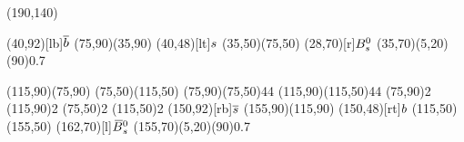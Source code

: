 \documentclass{standalone}
\begin{document}
\begin{axopicture}(190,140)

  \Text(40,92)[lb]{${\overline {{b}}}$}    %
  \Line[arrow](75,90)(35,90)        %
  \Text(40,48)[lt]{${s}$}       %
  \Line[arrow](35,50)(75,50)        %
  \Text(28,70)[r]{${{B}^0_{s}}$}            %
  \GOval(35,70)(5,20)(90){0.7}      %
                                    
  \Line[arrow](115,90)(75,90)       %
  \Line[arrow](75,50)(115,50)       %
  \Photon(75,90)(75,50){4}{4}       %
  \Photon(115,90)(115,50){4}{4}     %
  \Vertex(75,90){2}                 %
  \Vertex(115,90){2}                %
  \Vertex(75,50){2}                 %
  \Vertex(115,50){2}                %
  \Text(150,92)[rb]{${\overline {{s}}}$}   %
  \Line[arrow](155,90)(115,90)      %
  \Text(150,48)[rt]{${b}$}      %
  \Line[arrow](115,50)(155,50)      %
  \Text(162,70)[l]{${{\kern 0.18em\overline{\kern -0.18em B}}{}^0_{s}}$}          %
  \GOval(155,70)(5,20)(90){0.7}     %
                                    
\end{axopicture}
\end{document}
